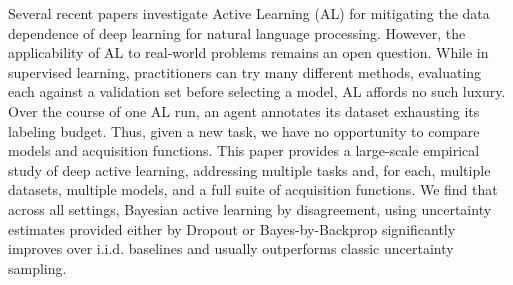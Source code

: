 Several recent papers investigate Active Learning (AL) for mitigating the data dependence of deep learning for natural language processing. However, the applicability of AL to real-world problems remains an open question. While in supervised learning, practitioners can try many different methods, evaluating each against a validation set before selecting a model, AL affords no such luxury. Over the course of one AL run, an agent annotates its dataset exhausting its labeling budget. Thus, given a new task, we have no opportunity to compare models and acquisition functions. This paper provides a large-scale empirical study of deep active learning, addressing multiple tasks and, for each, multiple datasets, multiple models, and a full suite of acquisition functions. We find that across all settings, Bayesian active learning by disagreement, using uncertainty estimates provided either by Dropout or Bayes-by-Backprop significantly improves over i.i.d. baselines and usually outperforms classic uncertainty sampling.
